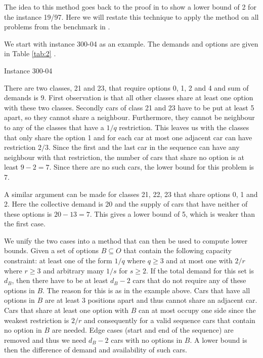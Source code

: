 \documentclass[]{easychair}
\begin{document}
The idea to this method goes back to the proof in \cite{Gent98} to show a lower bound of 2 for the instance 19/97. Here
we will restate this technique to apply the method on all problems from the benchmark in \cite{Gravel05}. 

We start with instance 300-04 as an example. The demands and options are given in Table \ref{tab:2} . 

\begin{table}[htbp]
    \caption{Instance 300-04}
    \begin{center}
    
    \end{center}
    \label{tab:2}
\end{table}

There are two classes, 21 and 23, that require options 0, 1, 2 and 4 and sum of demands is 9. First observation is that
all other classes share at least one option with these two classes.  Secondly cars of class 21 and 23 have to be put at
least 5 apart, so they cannot share a neighbour. Furthermore, they cannot be neighbour to any of the classes that have a
$1/q$ restriction. This leaves us with the classes that only share the option 1 and for each car at most one adjacent
car can have restriction $2/3$. Since the first and the last car in the sequence can have any neighbour with that
restriction, the number of cars that share no option is at least $9-2=7$. Since there are no such cars, the lower bound
for this problem is 7. 

A similar argument can be made for classes 21, 22, 23 that share options 0, 1 and 2. Here the collective demand is 20
and the supply of cars that have neither of these options is $20 - 13 = 7$. This gives a lower bound of 5, which is
weaker than the first case. 

We unify the two cases into a method that can then be used to compute lower bounds. Given a set of options $B\subseteq
O$ that contain the following capacity constraint: at least one of the form $1/q$ where $q \geq 3$ and at most one with
$2/r$ where $r \geq 3$ and arbitrary many $1/s$ for $s \geq 2$. If the total demand for this set is $d_B$, then there
have to be at least $d_B-2$ cars that do not require any of these options in $B$. The reason for this is as in the
example above. Cars that have all options in $B$ are at least 3 positions apart and thus cannot share an adjacent car.
Cars that share at least one option with $B$ can at most occupy one side since the weakest restriction is $2/r$ and
consequently for a valid sequence cars that contain no option in $B$ are needed. Edge cases (start and end of the
sequence) are removed and thus we need $d_B-2$ cars with no options in $B$. A lower bound is then the difference of
demand and availability of such cars. 
\end{document}
